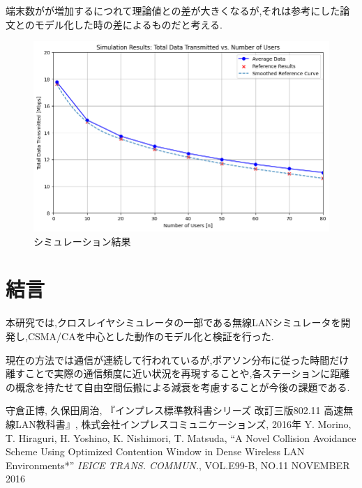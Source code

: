 \documentclass[a4paper, 10pt]{ltjsarticle}
\begin{document}
端末数がが増加するにつれて理論値との差が大きくなるが,それは参考にした論文\cite{paper}とのモデル化した時の差によるものだと考える.

\begin{figure}[H]
  \centering
  \includegraphics[width=1\columnwidth]{./assets/g3.png}
  \caption{シミュレーション結果}
  \label{fig:simulation-result}
\end{figure}


\section{結言}
本研究では,クロスレイヤシミュレータの一部である無線LANシミュレータを開発し,CSMA/CAを中心とした動作のモデル化と検証を行った.

現在の方法では通信が連続して行われているが,ポアソン分布に従った時間だけ離すことで実際の通信頻度に近い状況を再現することや,各ステーションに距離の概念を持たせて自由空間伝搬による減衰を考慮することが今後の課題である.

\begin{thebibliography}{9}
  守倉正博, 久保田周治, 『インプレス標準教科書シリーズ 改訂三版802.11 高速無線LAN教科書』, 株式会社インプレスコミュニケーションズ, 2016年
  Y. Morino, T. Hiraguri, H. Yoshino, K. Nishimori, T. Matsuda, ``A Novel Collision Avoidance Scheme Using Optimized Contention Window in Dense Wireless LAN Environments*'' \; \textit{IEICE TRANS. COMMUN.}, VOL.E99-B, NO.11 NOVEMBER 2016
\end{thebibliography}
\end{document}
